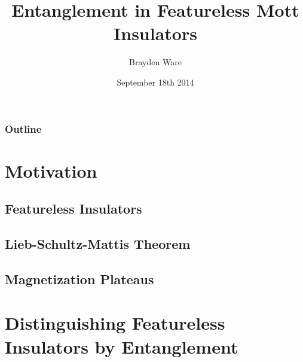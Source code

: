 \documentclass[t]{beamer}
\title{Entanglement in Featureless Mott Insulators}
\author{Brayden Ware}
\date{September 18th 2014}
\begin{document}
\frame{\titlepage}



% 

\section*{}

\begin{frame}
  \frametitle{Outline}
  \vskip-1.5cm
  \tableofcontents
\end{frame}



\section{Motivation}
\subsection{Featureless Insulators}

\subsection{Lieb-Schultz-Mattis Theorem}

\subsection{Magnetization Plateaus}



\section{Distinguishing Featureless Insulators by Entanglement}

\end{document}
